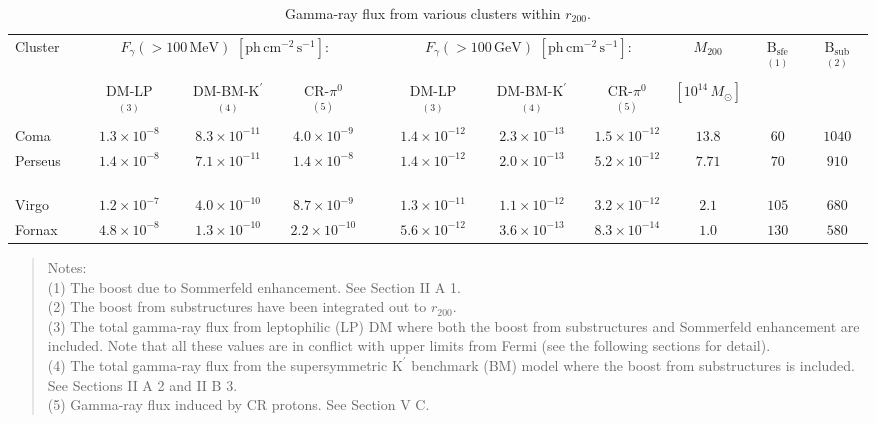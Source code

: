 \documentclass[10pt,aps,pra,reprint,amsmath,amsfonts,amssymb,showpacs,nofootinbib,floatfix]{revtex4-1}
\newcommand{\rmn}{\mathrm}
\newcommand{\msun}{M_\odot}
\newcommand{\Kp}{\rmn{K}^\prime}
\newcommand{\B}{\rmn{B}}
\newcommand{\rvir}{r_{200}}
\newcommand{\mvir}{M_{200}}
\begin{document}
\begin{table}
\begin{minipage}{2.0\columnwidth}
  \caption{Gamma-ray flux from various clusters within $\rvir$.}
\begin{tabular}{l  c c c  c  c c c c c c}
\hline
\hline
 Cluster &
\multicolumn{3}{c}{$F_{\gamma}(>100\,\rmn{MeV})$ $[\rmn{ph}\,\rmn{cm}^{-2}\,\rmn{s}^{-1}]$:} & &
\multicolumn{3}{c}{$F_{\gamma}(>100\,\rmn{GeV})$ $[\rmn{ph}\,\rmn{cm}^{-2}\,\rmn{s}^{-1}]$:} & 
$\mvir$ & $\B_\rmn{sfe} $$^{(1)}$ &  $\B_\rmn{sub} $$^{(2)}$ \\
         & DM-LP $^{(3)}$ & DM-BM-$\Kp$ $^{(4)}$ & CR-$\pi^0$ $^{(5)}$ 
         & & DM-LP $^{(3)}$ & DM-BM-$\Kp$ $^{(4)}$ & CR-$\pi^0$ $^{(5)}$ & $[10^{14}\,\msun]$ &&  \\
 \hline
 Coma                 & $1.3\times10^{-8}$  & $8.3\times10^{-11}$ & $4.0\times10^{-9}$  
 & \,\,\,\,\,         & $1.4\times10^{-12}$ & $2.3\times10^{-13}$ & $1.5\times10^{-12}$ 
 & $13.8$ & $60$  & $1040$ \\
 Perseus \,\,\,\,\,\, & $1.4\times10^{-8}$  & $7.1\times10^{-11}$ & $1.4\times10^{-8}$  
 & \,\,\,\,\,         & $1.4\times10^{-12}$ & $2.0\times10^{-13}$ & $5.2\times10^{-12}$ 
 & $7.71$ & $70$  & $910$ \\
 Virgo                & $1.2\times10^{-7}$  & $4.0\times10^{-10}$ & $8.7\times10^{-9}$  
 & \,\,\,\,\,         & $1.3\times10^{-11}$ & $1.1\times10^{-12}$ & $3.2\times10^{-12}$ 
 & $2.1$  & $105$  & $680$  \\
 Fornax               & $4.8\times10^{-8}$  & $1.3\times10^{-10}$ & $2.2\times10^{-10}$ 
 & \,\,\,\,\,         & $5.6\times10^{-12}$ & $3.6\times10^{-13}$ & $8.3\times10^{-14}$ 
 & $1.0$  & $130$  & $580$  \\
\hline
\hline
\end{tabular}
\begin{quote}
  Notes: \\
  (1) The boost due to Sommerfeld enhancement. See Section II A 1.\\
  (2) The boost from substructures have been integrated out to $\rvir$.\\
  (3) The total gamma-ray flux from leptophilic (LP) DM where both the
  boost from substructures and Sommerfeld enhancement are
  included. Note that all these values are in conflict with upper limits from
  Fermi (see the following sections for detail).\\
  (4) The total gamma-ray flux from the supersymmetric $\Kp$ benchmark (BM) 
  model where the boost from substructures is included. See Sections II A 2 and II B 3.\\
  (5) Gamma-ray flux induced by CR protons. See Section V C. 
 \label{tab:flux_tab}
  \end{quote}
\end{minipage}
\end{table} 
\end{document}
